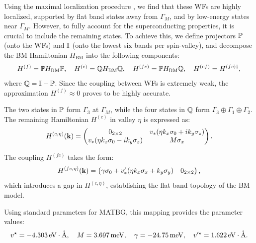 Using the maximal localization procedure \cite{maxlocalWFs_marzari2012, wannier90}, we find that these WFs are highly localized, supported by flat band states away from $\Gamma_M$, and by low-energy states near $\Gamma_M$. However, to fully account for the superconducting properties, it is crucial to include the remaining states. To achieve this, we define projectors $\bP$ (onto the WFs) and $\I$ (onto the lowest six bands per spin-valley), and decompose the BM Hamiltonian $H_\text{BM}$ into the following components:
\begin{equation} \label{eq:projected_hamiltonians_WFs_PQ}
H^{(f)} = \bP H_\text{BM} \bP, \quad H^{(c)} = \bQ H_\text{BM} \bQ, \quad H^{(fc)} = \bP H_\text{BM} \bQ, \quad H^{(cf)} = H^{(fc)\dagger},
\end{equation}
where $\bQ = \I - \bP$. Since the coupling between WFs is extremely weak, the approximation $H^{(f)} \approx 0$ proves to be highly accurate.

The two states in $\bP$ form $\Gamma_3$ at $\Gamma_M$, while the four states in $\bQ$ form $\Gamma_3 \oplus \Gamma_1 \oplus \Gamma_2$. The remaining Hamiltonian $H^{(c)}$ in valley $\eta$ is expressed as:
\begin{equation} \label{eq:H(c)_topoheavyfermion}
H^{(c, \eta)}(\k) =
\begin{pmatrix}
0_{2\times 2} & v_* (\eta k_x \sigma_0 + i k_y \sigma_z) \\
v_* (\eta k_x \sigma_0 - i k_y \sigma_z) & M \sigma_x
\end{pmatrix}.
\end{equation}

The coupling $H^{(fc)}$ takes the form:
\begin{equation} \label{eq:H(fc)_topoheavyfermion}
H^{(fc, \eta)}(\k) =
\begin{pmatrix}
\gamma \sigma_0 + v'_* (\eta k_x \sigma_x + k_y \sigma_y) & 0_{2\times 2}
\end{pmatrix},
\end{equation}
which introduces a gap in $H^{(c, \eta)}$, establishing the flat band topology of the BM model.

Using standard parameters for MATBG, this mapping provides the parameter values:
\begin{equation} \label{eq:paramaters_topoheavyfermion}
v^\star = -4.303 \, \text{eV} \cdot \AA, \quad M = 3.697 \, \text{meV}, \quad \gamma = -24.75 \, \text{meV}, \quad v'^\star = 1.622 \, \text{eV} \cdot \AA.
\end{equation}

